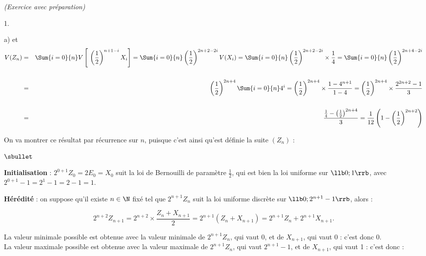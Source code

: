 \documentclass[11pt]{article}%
\begin{document}
\begin{exercice}{\it (Exercice avec préparation)}
\begin{noliste}{1.}
\begin{noliste}{a)}
 et
 \begin{eqnarray*}
 V ( Z_{n} ) & = & \Sum{i = 0}{n} V \left[ \ \left( \frac{ 1 }{ 2 }
\right)^{ n + 1 - i } X_{i} \right] = \Sum{i = 0}{n} \left( \frac{ 1 }{
2 } \right)^{ 2n + 2 -2 i } V ( X_{i} ) = \Sum{i = 0}{n} \left( \frac{
1 }{ 2 } \right)^{ 2n + 2 -2 i } \times \frac{1}{4} = \Sum{i = 0}{n}
\left( \frac{ 1 }{ 2 } \right)^{ 2n + 4 -2 i } \\
\\
 & = & \left( \frac{ 1 }{ 2 } \right)^{2n + 4} \Sum{i = 0}{n} 4^{i} =
\left( \frac{ 1 }{ 2 } \right)^{ 2n + 4 } \times \frac{ 1 - 4^{n + 1}
}{ 1 - 4 } = \left( \frac{ 1 }{ 2 } \right)^{ 2n + 4 } \times \frac{
2^{2n + 2} - 1 }{ 3 } \\
\\
 & = & \frac{ \frac{ 1 }{ 4 } - \left( \frac{ 1 }{ 2 } \right)^{ 2n + 4
} }{ 3 } = \frac{ 1 }{ 12 } \left( 1 - \left( \frac{ 1 }{ 2 }
\right)^{2n + 2} \right)
 \end{eqnarray*}

 \end{noliste}

 \item On va montrer ce résultat par récurrence sur $n$, puisque c'est
ainsi qu'est définie la suite $(Z_{n})$ : \begin{noliste}{$\sbullet$}

 \item \textbf{Initialisation} : $2^{0 + 1} Z_{0} = 2 E_{0} = X_{0}$
suit la loi de Bernouilli de paramètre $\frac{ 1 }{ 2 }$, qui est bien
la loi uniforme sur $\llb 0 ; 1 \rrb$, avec $2^{0 + 1} - 1 = 2^{1} - 1
= 2 - 1 = 1 $. \\

 \item \textbf{Hérédité} : on suppose qu'il existe $n \in \N$ fixé tel
que $ 2^{n + 1} Z_{n}$ suit la loi uniforme discrète sur $\llb 0 ; 2^{n
+ 1} - 1 \rrb$, alors : 
 
\[
 2^{n + 2} Z_{n + 1} = 2^{n + 2} \times \frac{ Z_{n} + X_{n + 1} }{ 2 }
= 2^{ n + 1 } ( Z_{n} + X_{n + 1} ) = 2^{n + 1} Z_{n} + 2^{n + 1} X_{n
+ 1}. 
\]

 La valeur minimale possible est obtenue avec la valeur minimale de
$2^{n + 1} Z_{n}$, qui vaut 0, et de $X_{n + 1}$, qui vaut 0 : c'est
donc 0. \\

 La valeur maximale possible est obtenue avec la valeur maximale de
$2^{n + 1} Z_{n}$, qui vaut $2^{n + 1}-1$, et de $X_{n + 1}$, qui vaut
1 : c'est donc :
 

\end{noliste}
\end{noliste}
\end{exercice}
\end{document}
